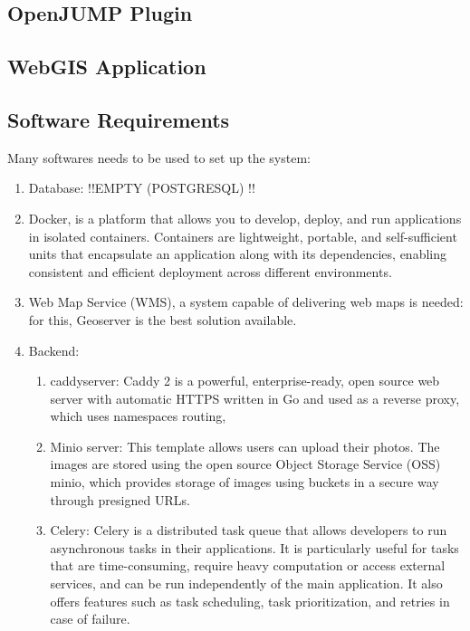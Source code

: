 \subsection{OpenJUMP Plugin}
\subsection{WebGIS Application}

\subsection{Software Requirements}
Many softwares needs to be used to set up the system:
\begin{enumerate}
    \item Database: !!EMPTY (POSTGRESQL) !!
    
    \item Docker, is a platform that allows you to develop, deploy, and run applications in isolated containers. Containers are lightweight, portable, and self-sufficient units that encapsulate an application along with its dependencies, enabling consistent and efficient deployment across different environments.
    
    \item Web Map Service (WMS), a system capable of delivering web maps is needed: for this, Geoserver is the best solution available.
    
    \item Backend:
    \begin{enumerate}
        \item caddyserver: Caddy 2 is a powerful, enterprise-ready, open source web server with automatic HTTPS written in Go and used as a reverse proxy, which uses namespaces routing,
        
        \item Minio server: This template allows users can upload their photos. The images are stored using the open source Object Storage Service (OSS) minio, which provides storage of images using buckets in a secure way through presigned URLs.
    
        \item Celery: Celery is a distributed task queue that allows developers to run asynchronous tasks in their applications. It is particularly useful for tasks that are time-consuming, require heavy computation or access external services, and can be run independently of the main application. It also offers features such as task scheduling, task prioritization, and retries in case of failure.
        

\end{enumerate}
\end{enumerate}
